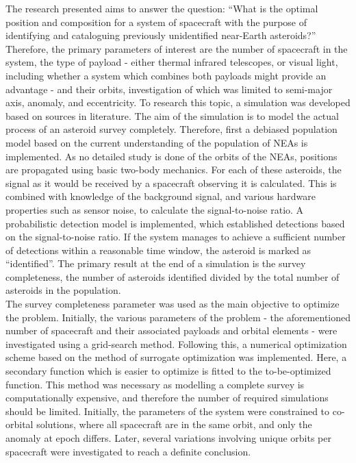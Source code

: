 The research presented aims to answer the question: ``What is the optimal position and composition for a system of spacecraft with the purpose of identifying and cataloguing previously unidentified near-Earth asteroids?'' Therefore, the primary parameters of interest are the number of spacecraft in the system, the type of payload - either thermal infrared telescopes, or visual light, including whether a system which combines both payloads might provide an advantage - and their orbits, investigation of which was limited to semi-major axis, anomaly, and eccentricity. To research this topic, a simulation was developed based on sources in literature. The aim of the simulation is to model the actual process of an asteroid survey completely. Therefore, first a debiased population model based on the current understanding of the population of NEAs is implemented. As no detailed study is done of the orbits of the NEAs, positions are propagated using basic two-body mechanics. For each of these asteroids, the signal as it would be received by a spacecraft observing it is calculated. This is combined with knowledge of the background signal, and various hardware properties such as sensor noise, to calculate the signal-to-noise ratio. A probabilistic detection model is implemented, which established detections based on the signal-to-noise ratio. If the system manages to achieve a sufficient number of detections within a reasonable time window, the asteroid is marked as ``identified''. The primary result at the end of a simulation is the survey completeness, the number of asteroids identified divided by the total number of asteroids in the population. \\

The survey completeness parameter was used as the main objective to optimize the problem. Initially, the various parameters of the problem - the aforementioned number of spacecraft and their associated payloads and orbital elements - were investigated using a grid-search method. Following this, a numerical optimization scheme based on the method of surrogate optimization was implemented. Here, a secondary function which is easier to optimize is fitted to the to-be-optimized function. This method was necessary as modelling a complete survey is computationally expensive, and therefore the number of required simulations should be limited. Initially, the parameters of the system were constrained to co-orbital solutions, where all spacecraft are in the same orbit, and only the anomaly at epoch differs. Later, several variations involving unique orbits per spacecraft were investigated to reach a definite conclusion. \\

